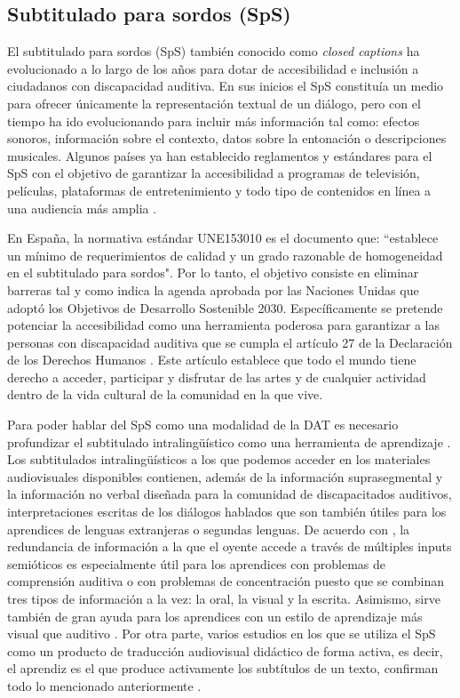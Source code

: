 \documentclass[spanish]{textolivre}
\begin{document}
\subsection{Subtitulado para sordos (SpS)}\label{sec-2.3}
El subtitulado para sordos (SpS) también conocido como \textit{closed captions} ha evolucionado a lo largo de los años para dotar de accesibilidad e inclusión a ciudadanos con discapacidad auditiva. En sus inicios el SpS constituía un medio para ofrecer únicamente la representación textual de un diálogo, pero con el tiempo ha ido evolucionando para incluir más información tal como: efectos sonoros, información sobre el contexto, datos sobre la entonación o descripciones musicales. Algunos países ya han establecido reglamentos y estándares para el SpS con el objetivo de garantizar la accesibilidad a programas de televisión, películas, plataformas de entretenimiento y todo tipo de contenidos en línea a una audiencia más amplia \cite{aenor2012}.

En España, la normativa estándar UNE153010 \cite[p. 4]{aenor2012} es el documento que: ``establece un mínimo de requerimientos de calidad y un grado razonable de homogeneidad en el subtitulado para sordos". Por lo tanto, el objetivo consiste en eliminar barreras tal y como indica la agenda aprobada por las Naciones Unidas \citeyear{un2015} que adoptó los Objetivos de Desarrollo Sostenible 2030. Específicamente se pretende potenciar la accesibilidad como una herramienta poderosa para garantizar a las personas con discapacidad auditiva que se cumpla el artículo 27 de la Declaración de los Derechos Humanos \cite{un1948}. Este artículo establece que todo el mundo tiene derecho a acceder, participar y disfrutar de las artes y de cualquier actividad dentro de la vida cultural de la comunidad en la que vive.

Para poder hablar del SpS como una modalidad de la DAT es necesario profundizar el subtitulado intralingüístico como una herramienta de aprendizaje \cite{vanderplank1988}. Los subtitulados intralingüísticos a los que podemos acceder en los materiales audiovisuales disponibles contienen, además de la información suprasegmental y la información no verbal diseñada para la comunidad de discapacitados auditivos, interpretaciones escritas de los diálogos hablados que son también útiles para los aprendices de lenguas extranjeras o segundas lenguas. De acuerdo con \textcite{gambier2015}, la redundancia de información a la que el oyente accede a través de múltiples inputs semióticos es especialmente útil para los aprendices con problemas de comprensión auditiva o con problemas de concentración puesto que se combinan tres tipos de información a la vez: la oral, la visual y la escrita. Asimismo, sirve también de gran ayuda para los aprendices con un estilo de aprendizaje más visual que auditivo \cite{tarquini2016}. Por otra parte, varios estudios en los que se utiliza el SpS como un producto de traducción audiovisual didáctico de forma activa, es decir, el aprendiz es el que produce activamente los subtítulos de un texto, confirman todo lo mencionado anteriormente \cite{talavan2019, talavan2020, talavan2022, couto-cantero-trovato2023}.
\end{document}
